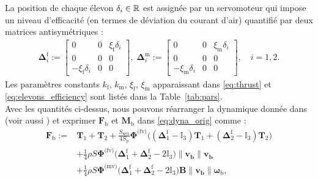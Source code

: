La position de chaque élevon $\delta_i \in {\mathbb R}$ est assignée par un servomoteur qui impose un niveau d'efficacité (en termes de déviation du courant d'air) quantifié par deux matrices antisymétriques :
\begin{align}
\label{eq:elevons_efficiency}
    \boldsymbol{\Delta}^{\text{f}}_{i} \!:=\! \begin{bmatrix} 0 & 0 & \xi_{\text{f}}\delta_{i} \\ 0 & 0 & 0 \\ -\xi_{\text{f}}\delta_{i} & 0 & 0 \end{bmatrix}\! ,\;
    \boldsymbol{\Delta}^{\text{m}}_{i} \!:=\! \begin{bmatrix} 0 & 0 & \xi_{\text{m}}\delta_{i} \\ 0 & 0 & 0 \\ -\xi_{\text{m}}\delta_{i} & 0 & 0 \end{bmatrix} \!, \quad i=1,2.
\end{align}
 Les paramètres constants $k_{\text{f}}$, $k_{\text{m}}$, $\xi_{\text{f}}$, $\xi_{\text{m}}$ apparaissant dans \eqref{eq:thrust} et \eqref{eq:elevons_efficiency} sont listés dans la Table~\ref{tab:pars}.\\
Avec les quantités ci-dessus, nous pouvons réarranger la dynamique donnée dans  \cite[eqns (97),~(98)]{lustosaHal-03035938} (voir aussi \cite{sansouStage}) et exprimer $\boldsymbol{F}_{\text{b}}$ et $\boldsymbol{M}_{\text{b}}$ dans \eqref{eq:dyna_orig} comme :
%
\begin{align}
\nonumber
    \boldsymbol{F}_{\text{b}} :={}&  \boldsymbol{T}_{1} + \boldsymbol{T}_{2} + \frac{S_{\text{wet}}}{4S_{\text{p}}} \boldsymbol{\Phi}^{\text{(fv)}} \Big( (\boldsymbol{\Delta}^{\text{f}}_1 - \mathbb{I}_{3} ) \boldsymbol{T}_{1} + ( \boldsymbol{\Delta}^{\text{f}}_2 - \mathbb{I}_{3}) \boldsymbol{T}_{2}\Big) \\ 
     \label{eq:Fbdarko}
    &+ \frac{1}{4} \rho S  \boldsymbol{\Phi}^{\text{(fv)}} \Big(\boldsymbol{\Delta}^{\text{f}}_1+ \boldsymbol{\Delta}^{\text{f}}_2 - 2 \mathbb{I}_{3} \Big) \lVert \boldsymbol{v_{\text{b}}} \rVert \boldsymbol{v_{\text{b}}}\\
    \nonumber
    &+ \frac{1}{4} \rho S \boldsymbol{\Phi}^{\text{(mv)}} \Big(\boldsymbol{\Delta}^{\text{f}}_1 + \boldsymbol{\Delta}^{\text{f}}_2 - 2\mathbb{I}_{3}\Big) \boldsymbol{B} \lVert \boldsymbol{v_{\text{b}}} \rVert  \boldsymbol{\omega}_{\text{b}}, 
\end{align}
